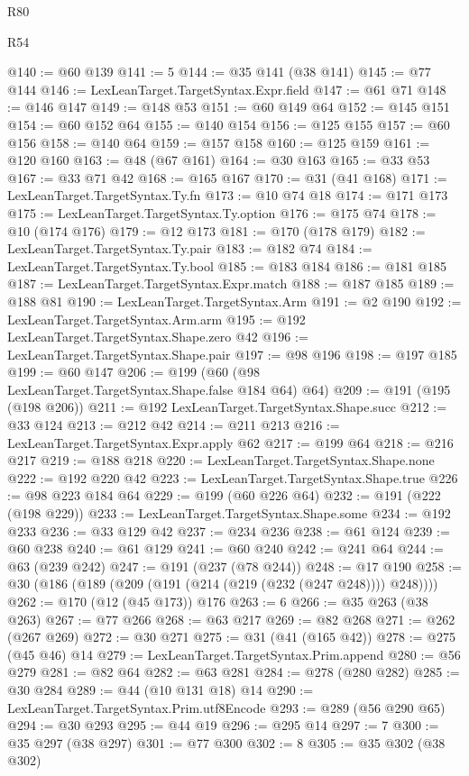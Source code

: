 \begin{lexlean}{R80}
\begin{lexlean}{R54}
\begin{coremodule}
{{{{{{{{{{{{{{{{{{{{{{{{{{{{{{{{{{{{{{{{{{{{{{{{{{@140 := @60 @139
@141 := 5
@144 := @35 @141 (@38 @141)
@145 := @77 @144
@146 := LexLeanTarget.TargetSyntax.Expr.field
@147 := @61 @71
@148 := @146 @147
@149 := @148 @53
@151 := @60 @149 @64
@152 := @145 @151
@154 := @60 @152 @64
@155 := @140 @154
@156 := @125 @155
@157 := @60 @156
@158 := @140 @64
@159 := @157 @158
@160 := @125 @159
@161 := @120 @160
@163 := @48 (@67 @161)
@164 := @30 @163
@165 := @33 @53
@167 := @33 @71 @42
@168 := @165 @167
@170 := @31 (@41 @168)
@171 := LexLeanTarget.TargetSyntax.Ty.fn
@173 := @10 @74 @18
@174 := @171 @173
@175 := LexLeanTarget.TargetSyntax.Ty.option
@176 := @175 @74
@178 := @10 (@174 @176)
@179 := @12 @173
@181 := @170 (@178 @179)
@182 := LexLeanTarget.TargetSyntax.Ty.pair
@183 := @182 @74
@184 := LexLeanTarget.TargetSyntax.Ty.bool
@185 := @183 @184
@186 := @181 @185
@187 := LexLeanTarget.TargetSyntax.Expr.match
@188 := @187 @185
@189 := @188 @81
@190 := LexLeanTarget.TargetSyntax.Arm
@191 := @2 @190
@192 := LexLeanTarget.TargetSyntax.Arm.arm
@195 := @192 LexLeanTarget.TargetSyntax.Shape.zero @42
@196 := LexLeanTarget.TargetSyntax.Shape.pair
@197 := @98 @196
@198 := @197 @185
@199 := @60 @147
@206 := @199 (@60 (@98 LexLeanTarget.TargetSyntax.Shape.false @184 @64) @64)
@209 := @191 (@195 (@198 @206))
@211 := @192 LexLeanTarget.TargetSyntax.Shape.succ
@212 := @33 @124
@213 := @212 @42
@214 := @211 @213
@216 := LexLeanTarget.TargetSyntax.Expr.apply @62
@217 := @199 @64
@218 := @216 @217
@219 := @188 @218
@220 := LexLeanTarget.TargetSyntax.Shape.none
@222 := @192 @220 @42
@223 := LexLeanTarget.TargetSyntax.Shape.true
@226 := @98 @223 @184 @64
@229 := @199 (@60 @226 @64)
@232 := @191 (@222 (@198 @229))
@233 := LexLeanTarget.TargetSyntax.Shape.some
@234 := @192 @233
@236 := @33 @129 @42
@237 := @234 @236
@238 := @61 @124
@239 := @60 @238
@240 := @61 @129
@241 := @60 @240
@242 := @241 @64
@244 := @63 (@239 @242)
@247 := @191 (@237 (@78 @244))
@248 := @17 @190
@258 := @30 (@186 (@189 (@209 (@191 (@214 (@219 (@232 (@247 @248)))) @248))))
@262 := @170 (@12 (@45 @173)) @176
@263 := 6
@266 := @35 @263 (@38 @263)
@267 := @77 @266
@268 := @63 @217
@269 := @82 @268
@271 := @262 (@267 @269)
@272 := @30 @271
@275 := @31 (@41 (@165 @42))
@278 := @275 (@45 @46) @14
@279 := LexLeanTarget.TargetSyntax.Prim.append
@280 := @56 @279
@281 := @82 @64
@282 := @63 @281
@284 := @278 (@280 @282)
@285 := @30 @284
@289 := @44 (@10 @131 @18) @14
@290 := LexLeanTarget.TargetSyntax.Prim.utf8Encode
@293 := @289 (@56 @290 @65)
@294 := @30 @293
@295 := @44 @19
@296 := @295 @14
@297 := 7
@300 := @35 @297 (@38 @297)
@301 := @77 @300
@302 := 8
@305 := @35 @302 (@38 @302)
}}}}}}}}}}}}}}}}}}}}}}}}}}}}}}}}}}}}}}}}}}}}}}}}}}
\end{coremodule}
\end{lexlean}
\end{lexlean}
